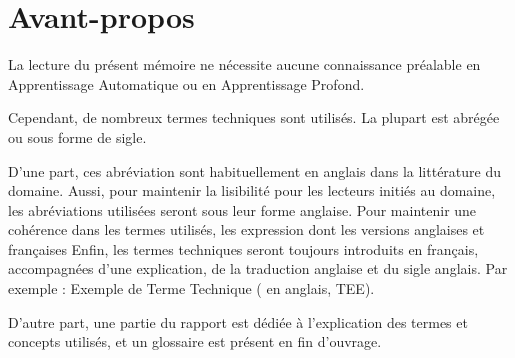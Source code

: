\section*{Avant-propos} %
La lecture du présent mémoire ne nécessite aucune connaissance préalable en Apprentissage Automatique ou en Apprentissage Profond.

Cependant, de nombreux termes techniques sont utilisés.
La plupart est abrégée ou sous forme de sigle.

{D'une part, ces abréviation sont habituellement en anglais dans la littérature du domaine.
Aussi, pour maintenir la lisibilité pour les lecteurs initiés au domaine, les abréviations utilisées seront sous leur forme anglaise.
Pour maintenir une cohérence dans les termes utilisés, les expression dont les versions anglaises et françaises 
Enfin, les termes techniques seront toujours introduits en français, accompagnées d'une explication, de la traduction anglaise et du sigle anglais. Par exemple : Exemple de Terme Technique ( en anglais, TEE).} %

D'autre part, une partie du rapport est dédiée à l'explication des termes et concepts utilisés, et un glossaire est présent en fin d'ouvrage.


